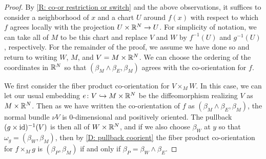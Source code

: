 \begin{proof}
	By \cref{R: co-or restriction or switch} and the above observations, it suffices to consider a neighborhood of $x$ and a chart $U$ around $f(x)$ with respect to which $f$ agrees locally with the projection $U \times \mathbb{R}^N \to U$.
	For simplicity of notation, we can take all of $M$ to be this chart and replace $V$ and $W$ by $f^{-1}(U)$ and $g^{-1}(U)$, respectively.
	For the remainder of the proof, we assume we have done so and return to writing $W$, $M$, and $V = M \times \mathbb{R}^N$.
	We can choose the ordering of the coordinates in $\mathbb{R}^N$ so that $(\beta_M \wedge \beta_E,\beta_M)$ agrees with the co-orientation for $f$.

	We first consider the fiber product co-orientation for $V \times_M W$.
	In this case, we can let our usual embedding $e \colon V \hookrightarrow M \times \mathbb{R}^N$ be the diffeomorphism realizing $V$ as $M \times \mathbb{R}^N$.
	Then as we have written the co-orientation of $f$ as $(\beta_M \wedge \beta_E,\beta_M)$, the normal bundle $\nu V$ is $0$-dimensional and positively oriented.
	The pullback $(g \times \mathrm{id})^{-1}(V)$ is then all of $W \times \mathbb{R}^N$, and if we also choose $\beta_W$ at $y$ so that $\omega_g = (\beta_W,\beta_M)$, then by \cref{D: pullback coorient} the fiber product co-orientation for $f \times_M g$ is $(\beta_P,\beta_M)$ if and only if $\beta_P = \beta_W \wedge \beta_E$.


\end{proof}
